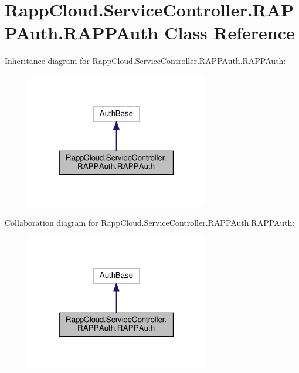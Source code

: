 \hypertarget{classRappCloud_1_1ServiceController_1_1RAPPAuth_1_1RAPPAuth}{\section{Rapp\-Cloud.\-Service\-Controller.\-R\-A\-P\-P\-Auth.\-R\-A\-P\-P\-Auth Class Reference}
\label{classRappCloud_1_1ServiceController_1_1RAPPAuth_1_1RAPPAuth}
}


Inheritance diagram for Rapp\-Cloud.\-Service\-Controller.\-R\-A\-P\-P\-Auth.\-R\-A\-P\-P\-Auth\-:
\nopagebreak
\begin{figure}[H]
\begin{center}
\leavevmode
\includegraphics[width=226pt]{classRappCloud_1_1ServiceController_1_1RAPPAuth_1_1RAPPAuth__inherit__graph}
\end{center}
\end{figure}


Collaboration diagram for Rapp\-Cloud.\-Service\-Controller.\-R\-A\-P\-P\-Auth.\-R\-A\-P\-P\-Auth\-:
\nopagebreak
\begin{figure}[H]
\begin{center}
\leavevmode
\includegraphics[width=226pt]{classRappCloud_1_1ServiceController_1_1RAPPAuth_1_1RAPPAuth__coll__graph}
\end{center}
\end{figure}
